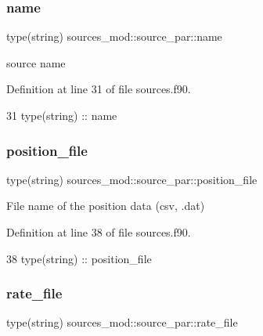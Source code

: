 \subsubsection{\texorpdfstring{name}{name}}
{\footnotesize\ttfamily type(string) sources\+\_\+mod\+::source\+\_\+par\+::name\hspace{0.3cm}{\ttfamily [private]}}



source name 



Definition at line 31 of file sources.\+f90.


\begin{DoxyCode}
31         \textcolor{keywordtype}{type}(string) :: name
\end{DoxyCode}
\mbox{\label{structsources__mod_1_1source__par_ac9fdc2c4ad7978c22b2624946f4f5d49}} 
\subsubsection{\texorpdfstring{position\+\_\+file}{position\_file}}
{\footnotesize\ttfamily type(string) sources\+\_\+mod\+::source\+\_\+par\+::position\+\_\+file\hspace{0.3cm}{\ttfamily [private]}}



File name of the position data (csv, .dat) 



Definition at line 38 of file sources.\+f90.


\begin{DoxyCode}
38         \textcolor{keywordtype}{type}(string) :: position\_file
\end{DoxyCode}
\mbox{\label{structsources__mod_1_1source__par_ae236b50563bb0dadd55af1aadac3023e}} 
\subsubsection{\texorpdfstring{rate\+\_\+file}{rate\_file}}
{\footnotesize\ttfamily type(string) sources\+\_\+mod\+::source\+\_\+par\+::rate\+\_\+file\hspace{0.3cm}{\ttfamily [private]}}



